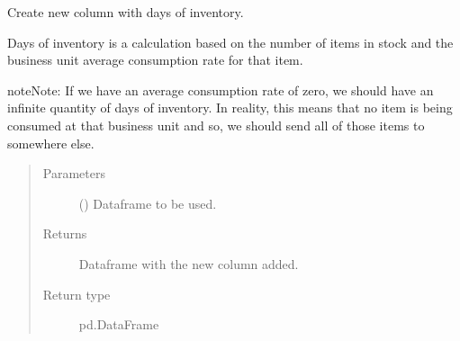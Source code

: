 \documentclass[letterpaper,10pt,english]{sphinxmanual}
\begin{document}
\begin{fulllineitems}
\label{\detokenize{source/optimization.datatools:optimization.datatools.dataprep.days_of_inventory}}
Create new column with days of inventory.

Days of inventory is a calculation based on the number of items in stock
and the business unit average consumption rate for that item.

\begin{sphinxadmonition}{note}{Note:}
If we have an average consumption rate of zero, we should have an
infinite quantity of days of inventory. In reality, this means that
no item is being consumed at that business unit and so, we should send all
of those items to somewhere else.
\end{sphinxadmonition}
\begin{quote}\begin{description}
\item[{Parameters}] \leavevmode
{} () \textendash{} Dataframe to be used.

\item[{Returns}] \leavevmode
{} \textendash{} Dataframe with the new column added.

\item[{Return type}] \leavevmode
pd.DataFrame

\end{description}\end{quote}

\end{fulllineitems}

\end{document}
